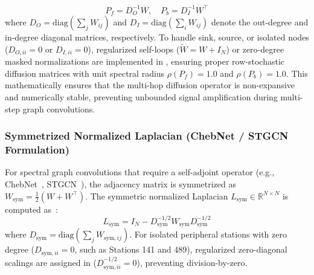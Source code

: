 \documentclass[preprint,12pt]{elsarticle}
\begin{document}
\begin{equation}
    P_f = D_O^{-1} W, \quad P_b = D_I^{-1} W^\top
\end{equation}
where $D_O = \text{diag}(\sum_{j} W_{ij})$ and $D_I = \text{diag}(\sum_{i} W_{ij})$ denote the out-degree and in-degree diagonal matrices, respectively. To handle sink, source, or isolated nodes ($D_{O, ii} = 0$ or $D_{I, ii} = 0$), regularized self-loops ($\tilde{W} = W + I_N$) or zero-degree masked normalizations are implemented in , ensuring proper row-stochastic diffusion matrices with unit spectral radius $\rho(P_f) = 1.0$ and $\rho(P_b) = 1.0$. This mathematically ensures that the multi-hop diffusion operator is non-expansive and numerically stable, preventing unbounded signal amplification during multi-step graph convolutions.

\clearpage
\subsubsection{Symmetrized Normalized Laplacian (ChebNet / STGCN Formulation)}
For spectral graph convolutions that require a self-adjoint operator (e.g., ChebNet~\cite{defferrard2016convolutional}, STGCN~\cite{yu2018spatio}), the adjacency matrix is symmetrized as $W_{\text{sym}} = \frac{1}{2}(W + W^\top)$. The symmetric normalized Laplacian $L_{\text{sym}} \in \mathbb{R}^{N \times N}$ is computed as~\cite{kipf2017semi}:
\begin{equation}
    L_{\text{sym}} = I_N - D_{\text{sym}}^{-1/2} W_{\text{sym}} D_{\text{sym}}^{-1/2}
\end{equation}
where $D_{\text{sym}} = \text{diag}(\sum_{j} W_{\text{sym}, ij})$. For isolated peripheral stations with zero degree ($D_{\text{sym}, ii} = 0$, such as Stations 141 and 489), regularized zero-diagonal scalings are assigned in  ($D_{\text{sym}, ii}^{-1/2} = 0$), preventing division-by-zero. 
\end{document}
